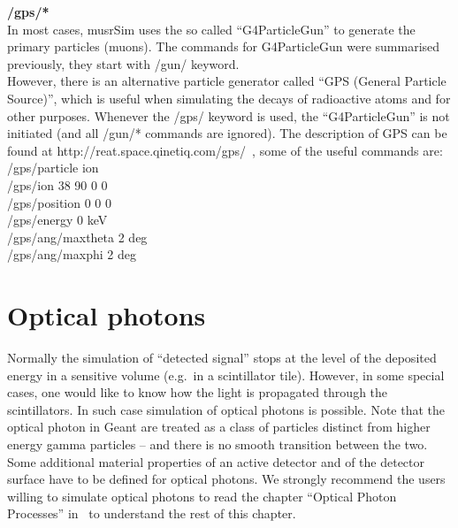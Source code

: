 \documentclass[twoside]{dis04}
\begin{document}
\begin{description}
\item{\bf /gps/*} \\
	In most cases, musrSim uses the so called ``G4ParticleGun'' to generate the primary
	particles (muons).  The commands for G4ParticleGun were summarised previously, 
	they start with /gun/ keyword.\\
	However, there is an alternative particle generator
	called ``GPS (General Particle Source)'', which is useful when simulating
	the decays of radioactive atoms and for other purposes.
	Whenever the /gps/ keyword is used, the ``G4ParticleGun'' is not initiated
	(and all /gun/* commands are ignored).
	The description of GPS can be found at http://reat.space.qinetiq.com/gps/~, 
	some of the useful commands are:\\
	/gps/particle ion\\
	/gps/ion 38 90 0 0\\
	/gps/position 0 0 0\\
	/gps/energy 0 keV\\
	/gps/ang/maxtheta 2 deg\\
	/gps/ang/maxphi 2 deg\\

\end{description}

\section{Optical photons}
\label{sec:opticalPhotons}
Normally the simulation of ``detected signal'' stops at the level of the deposited energy in 
a sensitive volume (e.g.\ in a scintillator tile).  However, in some special cases, one would
like to know how the light is propagated through the scintillators.  In such case simulation
of optical photons is possible.  Note that the optical photon in Geant are treated as a class
of particles distinct from higher energy gamma particles -- and there is no smooth transition
between the two.  Some additional material properties
of an active detector and of the detector surface have to be defined for optical photons.
We strongly recommend the users willing to simulate optical photons to read the 
chapter ``Optical Photon Processes'' in~\cite{geantUserManual} to understand the rest of
this chapter.
\end{document}
